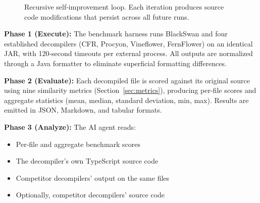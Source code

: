 \documentclass[conference,11pt]{IEEEtran}
\begin{document}
\begin{figure}[t]
\centering
{}
\caption{Recursive self-improvement loop. Each iteration produces source code modifications that persist across all future runs.}
\label{fig:loop}
\end{figure}

\textbf{Phase 1 (Execute):} The benchmark harness runs BlackSwan and four established decompilers (CFR, Procyon, Vineflower, FernFlower) on an identical JAR, with 120-second timeouts per external process. All outputs are normalized through a Java formatter to eliminate superficial formatting differences.

\textbf{Phase 2 (Evaluate):} Each decompiled file is scored against its original source using nine similarity metrics (Section~\ref{sec:metrics}), producing per-file scores and aggregate statistics (mean, median, standard deviation, min, max). Results are emitted in JSON, Markdown, and tabular formats.

\textbf{Phase 3 (Analyze):} The AI agent reads:
\begin{itemize}
    \item Per-file and aggregate benchmark scores
    \item The decompiler's own TypeScript source code
    \item Competitor decompilers' output on the same files
    \item Optionally, competitor decompilers' source code
\end{itemize}
\end{document}
